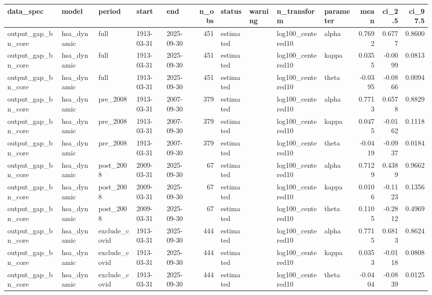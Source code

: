 \begin{tabular}{lllllrllllrrr}
\toprule
data\_spec & model & period & start & end & n\_obs & status & warning & n\_transform & parameter & mean & ci\_2.5 & ci\_97.5 \\
\midrule
output\_gap\_bn\_core & hsa\_dynamic & full & 1913-03-31 & 2025-09-30 & 451 & estimated &  & log100\_centered10 & alpha & 0.7692 & 0.6777 & 0.8600 \\
output\_gap\_bn\_core & hsa\_dynamic & full & 1913-03-31 & 2025-09-30 & 451 & estimated &  & log100\_centered10 & kappa & 0.0355 & -0.0099 & 0.0813 \\
output\_gap\_bn\_core & hsa\_dynamic & full & 1913-03-31 & 2025-09-30 & 451 & estimated &  & log100\_centered10 & theta & -0.0395 & -0.0866 & 0.0094 \\
output\_gap\_bn\_core & hsa\_dynamic & pre\_2008 & 1913-03-31 & 2007-09-30 & 379 & estimated &  & log100\_centered10 & alpha & 0.7713 & 0.6578 & 0.8829 \\
output\_gap\_bn\_core & hsa\_dynamic & pre\_2008 & 1913-03-31 & 2007-09-30 & 379 & estimated &  & log100\_centered10 & kappa & 0.0475 & -0.0162 & 0.1118 \\
output\_gap\_bn\_core & hsa\_dynamic & pre\_2008 & 1913-03-31 & 2007-09-30 & 379 & estimated &  & log100\_centered10 & theta & -0.0419 & -0.0937 & 0.0184 \\
output\_gap\_bn\_core & hsa\_dynamic & post\_2008 & 2009-03-31 & 2025-09-30 & 67 & estimated &  & log100\_centered10 & alpha & 0.7129 & 0.4389 & 0.9662 \\
output\_gap\_bn\_core & hsa\_dynamic & post\_2008 & 2009-03-31 & 2025-09-30 & 67 & estimated &  & log100\_centered10 & kappa & 0.0106 & -0.1123 & 0.1356 \\
output\_gap\_bn\_core & hsa\_dynamic & post\_2008 & 2009-03-31 & 2025-09-30 & 67 & estimated &  & log100\_centered10 & theta & 0.1105 & -0.2812 & 0.4969 \\
output\_gap\_bn\_core & hsa\_dynamic & exclude\_covid & 1913-03-31 & 2025-09-30 & 444 & estimated &  & log100\_centered10 & alpha & 0.7715 & 0.6813 & 0.8624 \\
output\_gap\_bn\_core & hsa\_dynamic & exclude\_covid & 1913-03-31 & 2025-09-30 & 444 & estimated &  & log100\_centered10 & kappa & 0.0353 & -0.0118 & 0.0808 \\
output\_gap\_bn\_core & hsa\_dynamic & exclude\_covid & 1913-03-31 & 2025-09-30 & 444 & estimated &  & log100\_centered10 & theta & -0.0404 & -0.0839 & 0.0125 \\

\end{tabular}
